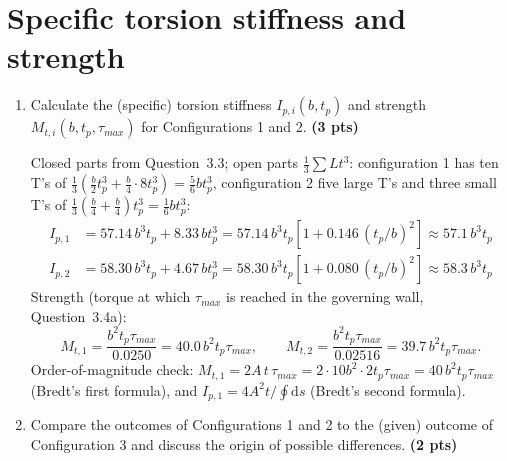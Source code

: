 \section{Specific torsion stiffness and strength}

\begin{enumerate}[label=\alph*.]
  \item Calculate the (specific) torsion stiffness $I_{p,i}(b,t_p)$ and strength $M_{t,i}(b,t_p,\tau_{max})$ for Configurations 1 and 2. \textbf{(3 pts)}

  Closed parts from Question~3.3; open parts $\frac13\sum Lt^3$: configuration 1 has ten T's of $\frac13(\tfrac b2t_p^3+\tfrac b4\cdot8t_p^3)=\tfrac56bt_p^3$, configuration 2 five large T's and three small T's of $\frac13(\tfrac b4+\tfrac b4)t_p^3=\tfrac16bt_p^3$:
  \begin{align}
    I_{p,1}&=57.14\,b^3t_p+8.33\,bt_p^3=57.14\,b^3t_p\left[1+0.146\,(t_p/b)^2\right]\approx\boxed{57.1\,b^3t_p}\\
    I_{p,2}&=58.30\,b^3t_p+4.67\,bt_p^3=58.30\,b^3t_p\left[1+0.080\,(t_p/b)^2\right]\approx\boxed{58.3\,b^3t_p}
  \end{align}
  Strength (torque at which $\tau_{max}$ is reached in the governing wall, Question~3.4a):
  \begin{equation}
    M_{t,1}=\frac{b^2t_p\tau_{max}}{0.0250}=\boxed{40.0\,b^2t_p\tau_{max}},\qquad
    M_{t,2}=\frac{b^2t_p\tau_{max}}{0.02516}=\boxed{39.7\,b^2t_p\tau_{max}} .
  \end{equation}
  Order-of-magnitude check: $M_{t,1}=2A\,t\,\tau_{max}=2\cdot10b^2\cdot2t_p\tau_{max}=40\,b^2t_p\tau_{max}$ (Bredt's first formula), and $I_{p,1}=4A^2t/\oint\mathrm{d}s$ (Bredt's second formula).

  \item Compare the outcomes of Configurations 1 and 2 to the (given) outcome of Configuration 3 and discuss the origin of possible differences. \textbf{(2 pts)}


\end{enumerate}
